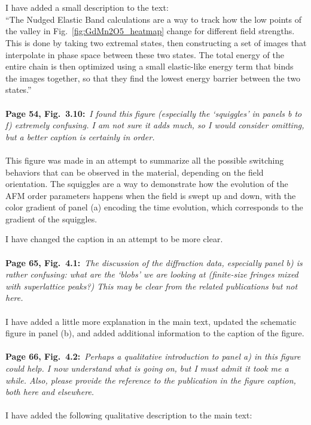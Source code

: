 \documentclass[a4, UTF8]{article}
\begin{document}
\\\\
I have added a small description to the text:\\
``The Nudged Elastic Band calculations are a way to track how the low points of the valley in Fig.~\ref{fig:GdMn2O5_heatmap} change for different field strengths.
This is done by taking two extremal states, then constructing a set of images that interpolate in phase space between these two states. The total energy of the entire chain is then optimized using a small elastic-like energy term that binds the images together, so that they find the lowest energy barrier between the two states.''
\\\\
{\bf Page 54, Fig.~3.10:}~{\it I found this figure (especially the `squiggles' in panels b to f) extremely confusing. I am not sure it adds much, so I would consider omitting, but a better caption is certainly in order.}
\\\\
This figure was made in an attempt to summarize all the possible switching behaviors that can be observed in the material, depending on the field orientation. The squiggles are a way to demonstrate how the evolution of the AFM order parameters happens when the field is swept up and down, with the color gradient of panel (a) encoding the time evolution, which corresponds to the gradient of the squiggles.

I have changed the caption in an attempt to be more clear.
\\\\
{\bf Page 65, Fig.~4.1:}~{\it The discussion of the diffraction data, especially panel b) is rather confusing:
what are the ‘blobs’ we are looking at (finite-size fringes mixed with superlattice peaks?) This may
be clear from the related publications but not here.}
\\\\
I have added a little more explanation in the main text, updated the schematic figure in panel (b), and added additional information to the caption of the figure.
\\\\
{\bf Page 66, Fig.~4.2:}~{\it Perhaps a qualitative introduction to panel a) in this figure could help. I now understand what is going on, but I must admit it took me a while. Also, please provide the
reference to the publication in the figure caption, both here and elsewhere.}
\\\\
I have added the following qualitative description to the main text:
\end{document}
